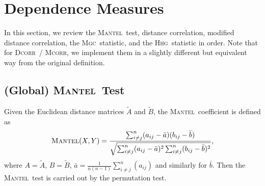 \documentclass[11pt]{article}
\providecommand{\sct}[1]{{\normalfont\textsc{#1}}}
\newcommand{\subfigimg}[3][,]{%
  \setbox1=\hbox{\texttt{[image: \#3]}}%
  \leavevmode\rlap{\usebox1}%
  \rlap{\hspace*{12pt}\raisebox{\dimexpr\ht1-0\baselineskip}{#2}}%
  \phantom{\usebox1}%
}
\newcommand{\Mgc}{\sct{Mgc}}
\newcommand{\Hhg}{\sct{Hhg}}
\newcommand{\Dcorr}{\sct{Dcorr}}
\newcommand{\Mcorr}{\sct{Mcorr}}
\newcommand{\Mantel}{\sct{Mantel}}
\begin{document}

\section{Dependence Measures}
\label{appen:methods}

In this section, we review the \Mantel~test, distance correlation, modified distance correlation, the \Mgc~statistic, and the \Hhg~statistic in order. Note that for \Dcorr~/ \Mcorr, we implement them in a slightly different but equivalent way from the original definition.

\subsection{(Global) \Mantel~Test}
\label{appen:mantel}
Given the Euclidean distance matrices $\tilde{A}$ and $\tilde{B}$, the \Mantel~coefficient \cite{Mantel1967} is defined as
\begin{equation*}
\Mantel(X,Y)=\frac{\sum_{i \neq j}^{n}(a_{ij}-\bar{a})(b_{ij}-\bar{b})}{\sqrt{\sum_{i \neq j}^{n}(a_{ij}-\bar{a})^2 \sum_{i \neq j}^{n}(b_{ij}-\bar{b})^2}},
\end{equation*}
where $A=\tilde{A}$, $B=\tilde{B}$, $\bar{a}=\frac{1}{n(n-1)}\sum_{i \neq j}^{n}(a_{ij})$ and similarly for $\bar{b}$. Then the \Mantel~test is carried out by the permutation test.
\end{document}
